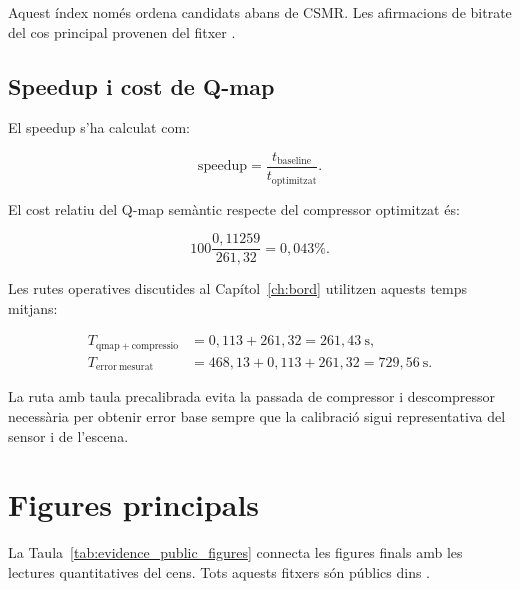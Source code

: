 Aquest índex només ordena candidats abans de CSMR. Les afirmacions de bitrate
del cos principal provenen del fitxer .

\subsection{Speedup i cost de Q-map}

El speedup s'ha calculat com:

\begin{equation}
\mathrm{speedup}=\frac{t_{\mathrm{baseline}}}{t_{\mathrm{optimitzat}}}.
\end{equation}

El cost relatiu del Q-map semàntic respecte del compressor optimitzat és:

\begin{equation}
100\frac{0,11259}{261,32}=0,043\%.
\end{equation}

Les rutes operatives discutides al Capítol~\ref{ch:bord} utilitzen aquests
temps mitjans:

\begin{align}
T_{\mathrm{qmap+compressio}} &=
0,113 + 261,32 = 261,43~\mathrm{s}, \\
T_{\mathrm{error\ mesurat}} &=
468,13 + 0,113 + 261,32 = 729,56~\mathrm{s}.
\end{align}

La ruta amb taula precalibrada evita la passada de compressor i descompressor
necessària per obtenir error base sempre que la calibració sigui representativa
del sensor i de l'escena.

\section{Figures principals}

La Taula~\ref{tab:evidence_public_figures} connecta les figures finals amb les
lectures quantitatives del cens. Tots aquests fitxers són públics dins
.

